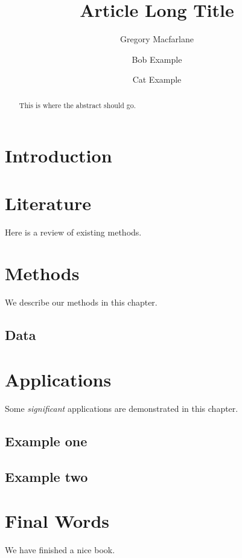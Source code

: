 \documentclass[3p]{elsarticle} %
\begin{document}
\begin{frontmatter}

  \title{Article Long Title}
    \author[Brigham Young University]{Gregory Macfarlane}
    \author[Brigham Young University]{Bob Example}
    \author[Another University]{Cat Example}
      \address[Brigham Young University]{Civil and Environmental Engineering Department, 430 Engineering Building, Provo, Utah 84602}
    \address[Another University]{Some Other Place}
  
  \begin{abstract}
  This is where the abstract should go.
  \end{abstract}
  
 \end{frontmatter}

\hypertarget{intro}{%
\section{Introduction}\label{intro}}

\hypertarget{literature}{%
\section{Literature}\label{literature}}

Here is a review of existing methods.

\hypertarget{methods}{%
\section{Methods}\label{methods}}

We describe our methods in this chapter.

\hypertarget{data}{%
\subsection{Data}\label{data}}

\hypertarget{applications}{%
\section{Applications}\label{applications}}

Some \emph{significant} applications are demonstrated in this chapter.

\hypertarget{example-one}{%
\subsection{Example one}\label{example-one}}

\hypertarget{example-two}{%
\subsection{Example two}\label{example-two}}

\hypertarget{final-words}{%
\section{Final Words}\label{final-words}}

We have finished a nice book.


\end{document}
